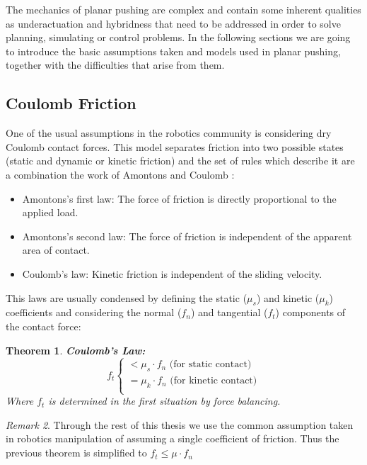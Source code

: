 \documentclass[12,twoside]{TFG-GM}
\newtheorem{theorem}{Theorem}[section]
\theoremstyle{definition}
\theoremstyle{remark}
\newtheorem{remark}[theorem]{Remark}
\begin{document}
The mechanics of planar pushing are complex and contain some inherent qualities as underactuation and hybridness that need to be addressed in order to solve planning, simulating or control problems. In the following sections we are going to introduce the basic assumptions taken and models used in planar pushing, together with the difficulties that arise from them.

\subsection{Coulomb Friction}
\label{subsec:coulomb}
One of the usual assumptions in the robotics community is considering dry Coulomb contact forces. This model separates friction into two possible states (static and dynamic or kinetic friction) and the set of rules which describe it are a combination the work of Amontons \cite{amontons} and Coulomb \cite{coulomb_law}:
\begin{itemize}
\item{Amontons's first law:} The force of friction is directly proportional to the applied load.
\item{Amontons's second law:} The force of friction is independent of the apparent area of contact.
\item{Coulomb's law:} Kinetic friction is independent of the sliding velocity.
\end{itemize}

This laws are usually condensed by defining the static ($\mu_s$) and kinetic ($\mu_k$) coefficients and considering the normal ($f_n$) and tangential ($f_t$) components of the contact force:

\begin{theorem} \textbf{Coulomb's Law:}
\[
  f_t\begin{cases}
               < \mu_s \cdot f_n   \text{ (for static contact)}\\
               = \mu_k \cdot f_n   \text{ (for kinetic contact)}\\
            \end{cases}
\]
Where $f_t$ is determined in the first situation by force balancing.
\end{theorem}

\begin{remark}
Through the rest of this thesis we use the common assumption taken in robotics manipulation of assuming a single coefficient of friction. Thus the previous theorem is simplified to $f_t \leq \mu \cdot f_n$
\end{remark}
\end{document}
